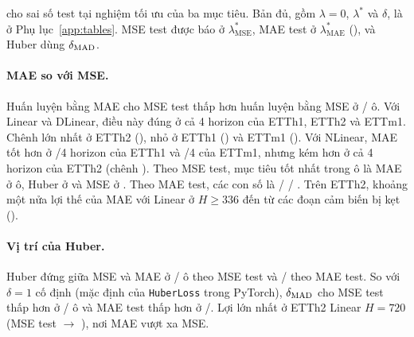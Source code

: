  cho sai số test tại nghiệm tối ưu của ba mục tiêu. Bản đủ, gồm $\lambda = 0$, $\lambda^*$ và $\delta$, là  ở Phụ lục~\ref{app:tables}. MSE test được báo ở $\lambda^*_{\mathrm{MSE}}$, MAE test ở $\lambda^*_{\mathrm{MAE}}$ (), và Huber dùng $\delta_{\mathrm{MAD}}$.

\begin{captionbelowboxaivn}
\label{tab:b3}
\end{captionbelowboxaivn}
{\small

}

\paragraph{MAE so với MSE.} Huấn luyện bằng MAE cho MSE test thấp hơn huấn luyện bằng MSE ở \nmBThreeMaeBeatsMseTotalCount/\nmBThreeCellCount{} ô. Với Linear và DLinear, điều này đúng ở cả 4 horizon của ETTh1, ETTh2 và ETTm1. Chênh lớn nhất ở ETTh2 (\nmBThreeMaeGainETThTwoLinDLinRange), nhỏ ở ETTh1 (\nmBThreeMaeGainETThOneLinDLinRange) và ETTm1 (\nmBThreeMaeGainETTmOneLinDLinRange). Với NLinear, MAE tốt hơn ở \nmBThreeMaeBeatsMseETThOneNLinearCount/4 horizon của ETTh1 và \nmBThreeMaeBeatsMseETTmOneNLinearCount/4 của ETTm1, nhưng kém hơn ở cả 4 horizon của ETTh2 (chênh \nmBThreeMaeGainETThTwoNLinearRange). Theo MSE test, mục tiêu tốt nhất trong ô là MAE ở \nmBThreeBestMAEMseCount{} ô, Huber ở \nmBThreeBestHuberMseCount{} và MSE ở \nmBThreeBestMSEMseCount. Theo MAE test, các con số là \nmBThreeBestMAEMaeCount{} / \nmBThreeBestHuberMaeCount{} / \nmBThreeBestMSEMaeCount. Trên ETTh2, khoảng một nửa lợi thế của MAE với Linear ở $H \ge 336$ đến từ các đoạn cảm biến bị kẹt ().

\paragraph{Vị trí của Huber.} Huber đứng giữa MSE và MAE ở \nmBThreeHuberRankTwoMseCount/\nmBThreeCellCount{} ô theo MSE test và \nmBThreeHuberRankTwoMaeCount/\nmBThreeCellCount{} theo MAE test. So với $\delta = 1$ cố định (mặc định của \texttt{HuberLoss} trong PyTorch), $\delta_{\mathrm{MAD}}$ cho MSE test thấp hơn ở \nmDeltaMadBetterMseCount/\nmBThreeCellCount{} ô và MAE test thấp hơn ở \nmDeltaMadBetterMaeCount/\nmBThreeCellCount. Lợi lớn nhất ở ETTh2 Linear $H = 720$ (MSE test \nmDeltaETThTwoLinearHSevenTwoZeroOne{} $\to$ \nmDeltaETThTwoLinearHSevenTwoZeroMad), nơi MAE vượt xa MSE.

